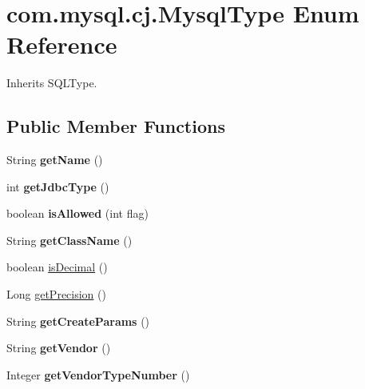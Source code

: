 \hypertarget{enumcom_1_1mysql_1_1cj_1_1_mysql_type}{}\section{com.\+mysql.\+cj.\+Mysql\+Type Enum Reference}
\label{enumcom_1_1mysql_1_1cj_1_1_mysql_type}


Inherits S\+Q\+L\+Type.

\subsection*{Public Member Functions}
\begin{DoxyCompactItemize}
\item 
\mbox{\label{enumcom_1_1mysql_1_1cj_1_1_mysql_type_a24a135e97525c118f3cdd32cbe3cda08}} 
String {\bfseries get\+Name} ()
\item 
\mbox{\label{enumcom_1_1mysql_1_1cj_1_1_mysql_type_ae737f5bd1ab16d3ec8cd7828128aa274}} 
int {\bfseries get\+Jdbc\+Type} ()
\item 
\mbox{\label{enumcom_1_1mysql_1_1cj_1_1_mysql_type_a1f97918428df4d6060c28e9b7600ba4b}} 
boolean {\bfseries is\+Allowed} (int flag)
\item 
\mbox{\label{enumcom_1_1mysql_1_1cj_1_1_mysql_type_aece90c449e68bd8c428889b5d01864ac}} 
String {\bfseries get\+Class\+Name} ()
\item 
boolean \mbox{\hyperlink{enumcom_1_1mysql_1_1cj_1_1_mysql_type_a212a8ea526160a1c989bc45f00946131}{is\+Decimal}} ()
\item 
Long \mbox{\hyperlink{enumcom_1_1mysql_1_1cj_1_1_mysql_type_ab636a1d0c77d0dc3e7daf32889cc2abe}{get\+Precision}} ()
\item 
\mbox{\label{enumcom_1_1mysql_1_1cj_1_1_mysql_type_a8a7d74c445dd27bb413e8588cdf2eae7}} 
String {\bfseries get\+Create\+Params} ()
\item 
\mbox{\label{enumcom_1_1mysql_1_1cj_1_1_mysql_type_aaa1bf1c44644ef088c4808905764350e}} 
String {\bfseries get\+Vendor} ()
\item 
\mbox{\label{enumcom_1_1mysql_1_1cj_1_1_mysql_type_a71eb160870bf8c9e399f829a2274427d}} 
Integer {\bfseries get\+Vendor\+Type\+Number} ()
\end{DoxyCompactItemize}
